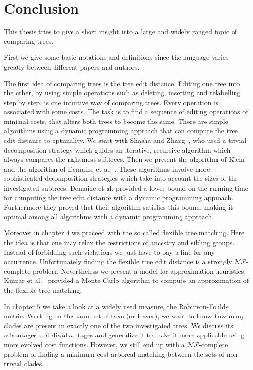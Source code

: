 \chapter{Conclusion}
This thesis tries to give a short insight into a large and widely ranged topic of comparing trees.

First we give some basic notations and definitions since the language varies greatly between different papers and authors. 

The first idea of comparing trees is the tree edit distance. Editing one tree into the other, by using simple operations such as deleting, inserting and relabelling step by step, is one intuitive way of comparing trees. Every operation is associated with some costs. The task is to find a sequence of editing operations of minimal costs, that alters both trees to become the same. There are simple algorithms using a dynamic programming approach that can compute the tree edit distance to optimality. We start with Shasha and Zhang~\cite{SasAndZha}, who used a trivial decomposition strategy which guides an iterative, recursive algorithm which always compares the rightmost subtrees. Then we present the algorithm of Klein~\cite{Kle} and the algorithm of Demaine et al.~\cite{Dem}. These algorithms involve more sophisticated decomposition strategies which take into account the sizes of the investigated subtrees. Demaine et al. provided a lower bound on the running time for computing the tree edit distance with a dynamic programming approach. Furthermore they proved that their algorithm satisfies this bound, making it optimal among all algorithms with a dynamic programming approach. 

Moreover in chapter $4$ we proceed with the so called flexible tree matching. Here the idea is that one may relax the restrictions of ancestry and sibling groups. Instead of forbidding such violations we just have to pay a fine for any occurrence. Unfortunately finding the flexible tree edit distance is a strongly $\mathcal{NP}$-complete problem. Nevertheless we present a model for approximation heuristics. Kumar et al.~\cite{Kum} provided a Monte Carlo algorithm to compute an approximation of the flexible tree matching.

In chapter $5$ we take a look at a widely used measure, the Robinson-Foulds metric. Working on the same set of taxa (or leaves), we want to know how many clades are present in exactly one of the two investigated trees. We discuss its advantages and disadvantages and generalize it to make it more applicable using more evolved cost functions. However, we still end up with a $\mathcal{NP}$-complete problem of finding a minimum cost arboreal matching between the sets of non-trivial clades.

